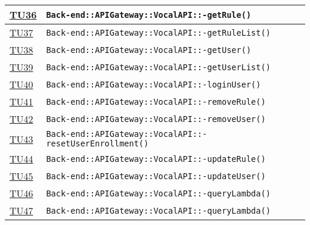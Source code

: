 \begin{longtable}{|>{\centering}m{1cm}|m{12cm}<{\centering}|}
\hyperlink{TU36}{TU36} & \texttt{Back-end::APIGateway::VocalAPI::-\linebreak getRule()}\\ \hline

\hyperlink{TU37}{TU37} & \texttt{Back-end::APIGateway::VocalAPI::-\linebreak getRuleList()}\\ \hline

\hyperlink{TU38}{TU38} & \texttt{Back-end::APIGateway::VocalAPI::-\linebreak getUser()}\\ \hline

\hyperlink{TU39}{TU39} & \texttt{Back-end::APIGateway::VocalAPI::-\linebreak getUserList()}\\ \hline

\hyperlink{TU40}{TU40} & \texttt{Back-end::APIGateway::VocalAPI::-\linebreak loginUser()}\\ \hline

\hyperlink{TU41}{TU41} & \texttt{Back-end::APIGateway::VocalAPI::-\linebreak removeRule()}\\ \hline

\hyperlink{TU42}{TU42} & \texttt{Back-end::APIGateway::VocalAPI::-\linebreak removeUser()}\\ \hline

\hyperlink{TU43}{TU43} & \texttt{Back-end::APIGateway::VocalAPI::-\linebreak resetUserEnrollment()}\\ \hline

\hyperlink{TU44}{TU44} & \texttt{Back-end::APIGateway::VocalAPI::-\linebreak updateRule()}\\ \hline

\hyperlink{TU45}{TU45} & \texttt{Back-end::APIGateway::VocalAPI::-\linebreak updateUser()}\\ \hline

\hyperlink{TU46}{TU46} & \texttt{Back-end::APIGateway::VocalAPI::-\linebreak queryLambda()}\\ \hline

\hyperlink{TU47}{TU47} & \texttt{Back-end::APIGateway::VocalAPI::-\linebreak queryLambda()}\\ \hline


\end{longtable}
